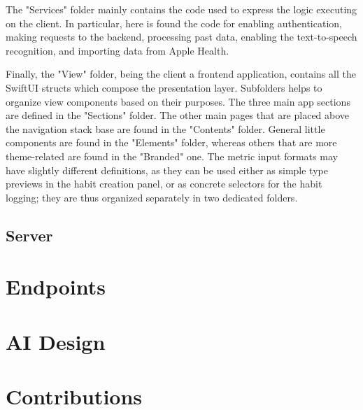 \documentclass{article}
\begin{document}
The "Services" folder mainly contains the code used to express the logic executing on the client.
In particular, here is found the code for enabling authentication, making requests to the backend, processing past data, enabling the text-to-speech recognition, and importing data from Apple Health.

Finally, the "View" folder, being the client a frontend application, contains all the SwiftUI structs which compose the presentation layer.
Subfolders helps to organize view components based on their purposes.
The three main app sections are defined in the "Sections" folder.
The other main pages that are placed above the navigation stack base are found in the "Contents" folder.
General little components are found in the "Elements" folder, whereas others that are more theme-related are found in the "Branded" one.
The metric input formats may have slightly different definitions, as they can be used either as simple type previews in the habit creation panel, or as concrete selectors for the habit logging; they are thus organized separately in two dedicated folders.

\subsection{Server}

\section{Endpoints}

\section{AI Design}

\section{Contributions}
\end{document}
